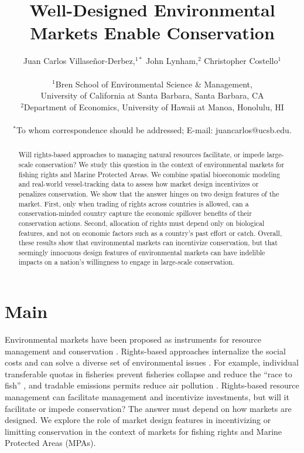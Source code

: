 \documentclass[12pt]{article}
\title{Well-Designed Environmental Markets Enable Conservation}
\author{Juan Carlos Villase\~{n}or-Derbez,$^{1\ast}$ John Lynham,$^{2}$ Christopher Costello$^{1}$\\
\\
\normalsize{$^{1}$Bren School of Environmental Science \& Management,}\\
\normalsize{University of California at Santa Barbara, Santa Barbara, CA}\\
\normalsize{$^{2}$Department of Economics, University of Hawaii at Manoa, Honolulu, HI}\\
\\
\normalsize{$^\ast$To whom correspondence should be addressed; E-mail: juancarlos@ucsb.edu.}
}
\date{}
\begin{document}

\baselineskip24pt


\maketitle



\begin{abstract}
Will rights-based approaches to managing natural resources facilitate, or impede large-scale conservation? We study this question in the context of environmental markets for fishing rights and Marine Protected Areas. We combine spatial bioeconomic modeling and real-world vessel-tracking data to assess how market design incentivizes or penalizes conservation. We show that the answer hinges on two design features of the market. First, only when trading of rights across countries is allowed, can a conservation-minded country capture the economic spillover benefits of their conservation actions. Second, allocation of rights must depend only on biological features, and not on economic factors such as a country's past effort or catch. Overall, these results show that environmental markets can incentivize conservation, but that seemingly innocuous design features of environmental markets can have indelible impacts on a nation's willingness to engage in large-scale conservation.
\end{abstract}

\clearpage

\section{Main}

Environmental markets have been proposed as instruments for resource management and conservation \cite{arsel_2012,sullivan_2013}. Rights-based approaches internalize the social costs and can solve a diverse set of environmental issues \cite{libecap_2009}. For example, individual transferable quotas in fisheries prevent fisheries collapse and reduce the ``race to fish'' \cite{costello_2008,birkenbach_2017}, and tradable emissions permits reduce air pollution \cite{joskow_1998}. Rights-based resource management can facilitate management and incentivize investments, but will it facilitate or impede conservation? The answer must depend on how markets are designed. We explore the role of market design features in incentivizing or limitting conservation in the context of markets for fishing rights and Marine Protected Areas (MPAs).
\end{document}
